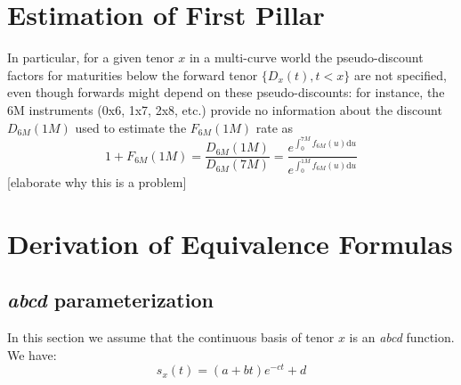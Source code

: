 \documentclass{article}
\begin{document}
\newpage
\appendix
\begin{appendices}
\section{Estimation of First Pillar}

In particular, for a given tenor $x$ in a multi-curve world the pseudo-discount factors for maturities below the forward tenor $\{D_x(t), t<x \}$ are not specified, even though forwards might depend on these 
pseudo-discounts: for instance, the 6M instruments (0x6, 1x7, 2x8, etc.) provide no information about the discount $D_{6M}(1M)$ used to estimate the $F_{6M}(1M)$ rate as
\begin{equation}
1+F_{6M}(1M) = \frac{D_{6M}(1M)}{D_{6M}(7M)} = \frac{e^{\int_0^{7M} f_{6M}(u)\mathrm{d}u}}{e^{\int_0^{1M} f_{6M}(u)\mathrm{d}u}}
\end{equation}
[elaborate why this is a problem]


\section{Derivation of Equivalence Formulas}

\subsection{\textit{abcd} parameterization}

In this section we assume that the continuous basis of tenor $x$ is an \textit{abcd} function. We have:
\begin{equation}
s_x(t) = (a + b t)e^{-c  t} + d
\end{equation}


\end{appendices}
\end{document}
